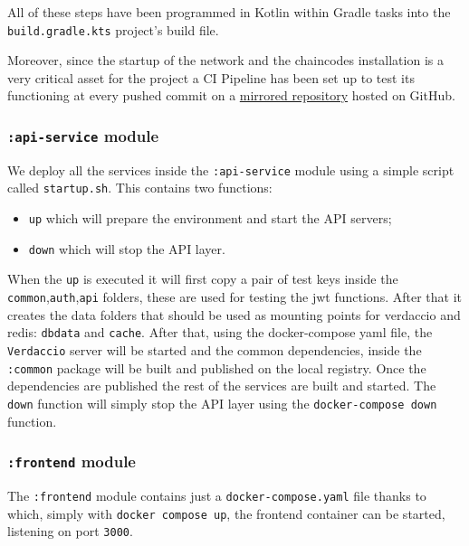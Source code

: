 \documentclass{scrartcl}
\begin{document}
All of these steps have been programmed in Kotlin within Gradle tasks into the \texttt{build.gradle.kts} project's build file.

Moreover, since the startup of the network and the chaincodes installation is a very critical asset for the project a CI Pipeline has been set up to test its functioning at every pushed commit on a \href{https://github.com/tassiLuca/ChainVote}{mirrored repository} hosted on GitHub.

\subsubsection*{\texttt{:api-service} module}

We deploy all the services inside the \texttt{:api-service} module using a simple script called \texttt{startup.sh}. This contains two functions: 
\begin{itemize}
    \item \texttt{up} which will prepare the environment and start the API servers;
    \item \texttt{down} which will stop the API layer.
\end{itemize} 

When the \texttt{up} is executed it will first copy a pair of test keys inside the \texttt{common},\texttt{auth},\texttt{api} folders, these are used for testing the jwt functions. 
After that it creates the data folders that should be used as mounting points for verdaccio and redis: \texttt{dbdata} and \texttt{cache}. 
After that, using the docker-compose yaml file, the \texttt{Verdaccio} server will be started and the common dependencies, inside the \texttt{:common} package will be built and published on the local registry.
Once the dependencies are published the rest of the services are built and started. The \texttt{down} function will simply stop the API layer using the \texttt{docker-compose down} function.

\subsubsection*{\texttt{:frontend} module}

The \texttt{:frontend} module contains just a \texttt{docker-compose.yaml} file thanks to which, simply with \texttt{docker compose up}, the frontend container can be started, listening on port \texttt{3000}.

\fi
\end{document}
